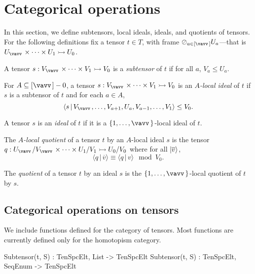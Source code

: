 \section{Categorical operations}

In this section, we define subtensors, local ideals, ideals, and quotients of tensors. 
For the following definitions fix a tensor $t\in T$, with frame $\rversor_{a\in[\vav]}U_a$---that is $U_{\vav}\times\cdots\times U_1\rightarrowtail U_0$. 
\begin{defn}
A tensor $s:V_{\vav}\times \cdots\times V_1\rightarrowtail V_0$ is a \emph{subtensor} of $t$ if for all $a$, $V_a\leq U_a$.
\end{defn}

\begin{defn}
For $A\subseteq [\vav]-0$, a tensor $s:V_{\vav}\times \cdots\times V_1\rightarrowtail V_0$ is an \emph{$A$-local ideal} of $t$ if $s$ is a subtensor of $t$ and for each $a\in A$, 
\[ \langle s \,|\, V_{\vav},\dots, V_{a+1}, U_a, V_{a-1},\dots, V_1\rangle \leq V_0 .\]
\end{defn}

\begin{defn}
A tensor $s$ is an \emph{ideal} of $t$ if it is a $\{1,\dots,\vav\}$-local ideal of $t$. 
\end{defn}

\begin{defn}
The \emph{$A$-local quotient} of a tensor $t$ by an $A$-local ideal $s$ is the tensor $q:U_{\vav}/V_{\vav} \times \cdots \times U_1/V_1\rightarrowtail U_0/V_0$ where for all $| \overline{v}\rangle$,
\[ \langle q \,|\, \overline{v}\rangle \equiv \langle q \,|\, v\rangle \mod V_0. \]
\end{defn}

\begin{defn}
The \emph{quotient} of a tensor $t$ by an ideal $s$ is the $\{1,\dots,\vav\}$-local quotient of $t$ by $s$.
\end{defn}

\subsection{Categorical operations on tensors}

We include functions defined for the category of tensors.
Most functions are currently defined only for the homotopism category.

\begin{intrinsics}
Subtensor(t, S) : TenSpcElt, List -> TenSpcElt
Subtensor(t, S) : TenSpcElt, SeqEnum -> TenSpcElt
\end{intrinsics}

